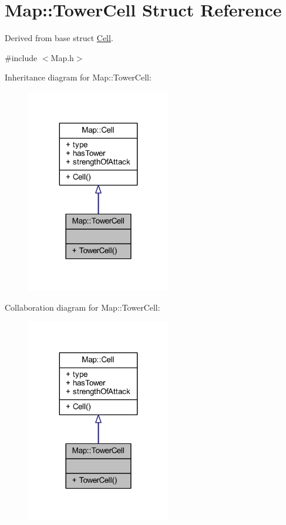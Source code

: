 \hypertarget{struct_map_1_1_tower_cell}{\section{Map\+:\+:Tower\+Cell Struct Reference}
\label{struct_map_1_1_tower_cell}
}


Derived from base struct \hyperlink{struct_map_1_1_cell}{Cell}.  




{\ttfamily \#include $<$Map.\+h$>$}



Inheritance diagram for Map\+:\+:Tower\+Cell\+:
\nopagebreak
\begin{figure}[H]
\begin{center}
\leavevmode
\includegraphics[width=179pt]{struct_map_1_1_tower_cell__inherit__graph}
\end{center}
\end{figure}


Collaboration diagram for Map\+:\+:Tower\+Cell\+:
\nopagebreak
\begin{figure}[H]
\begin{center}
\leavevmode
\includegraphics[width=179pt]{struct_map_1_1_tower_cell__coll__graph}
\end{center}
\end{figure}
